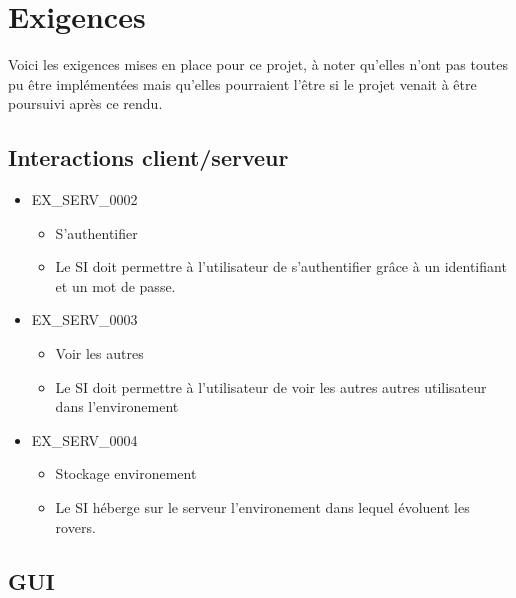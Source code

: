 \documentclass[12pt,a4paper]{scrartcl}
\begin{document}
\section{Exigences}
Voici les exigences mises en place pour ce projet, à noter qu'elles n'ont pas toutes pu être implémentées
mais qu'elles pourraient l'être si le projet venait à être poursuivi après ce rendu.

\subsection{Interactions client/serveur}

\begin{itemize}

\item EX\_SERV\_0002
\begin{itemize}
\item S'authentifier
\item Le SI doit permettre à l'utilisateur de s'authentifier grâce à un
		identifiant et un mot de passe.
\end{itemize}


\item EX\_SERV\_0003
\begin{itemize}
\item Voir les autres
\item Le SI doit permettre à l'utilisateur de voir les autres autres 
	utilisateur dans l'environement
\end{itemize}

\item EX\_SERV\_0004
\begin{itemize}
\item Stockage environement
\item Le SI héberge sur le serveur l'environement dans lequel évoluent les 
	rovers.
\end{itemize}


\end{itemize}

\subsection{GUI}
\end{document}
